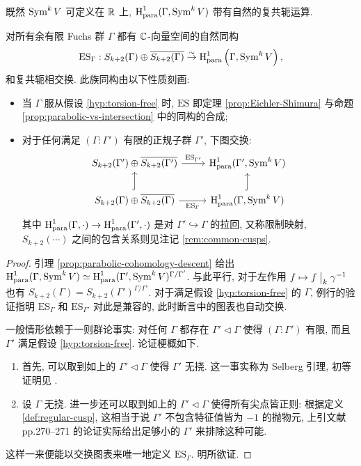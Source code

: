 既然 $\operatorname{Sym}^k V$ 可定义在 $\mathbb{R}$ 上, $\operatorname{H}^1_{\mathrm{para}}(\Gamma, \operatorname{Sym}^k V)$ 带有自然的复共轭运算.

\begin{theorem}\label{prop:Eichler-Shimura-gen}
	对所有余有限 Fuchs 群 $\Gamma$ 都有 $\mathbb{C}$-向量空间的自然同构
	\[ \mathrm{ES}_\Gamma: S_{k+2}(\Gamma) \oplus \overline{S_{k+2}(\Gamma)} \stackrel{\sim}{\rightarrow} \operatorname{H}^1_{\mathrm{para}}\left(\Gamma, \operatorname{Sym}^k V\right), \]
	和复共轭相交换. 此族同构由以下性质刻画:
	\begin{itemize}
		\item 当 $\Gamma$ 服从假设 \ref{hyp:torsion-free} 时, $\mathrm{ES}$ 即定理 \ref{prop:Eichler-Shimura} 与命题 \ref{prop:parabolic-vs-intersection} 中的同构的合成;
		\item 对于任何满足 $(\Gamma : \Gamma')$ 有限的正规子群 $\Gamma'$, 下图交换:
		\[\begin{tikzcd}
			S_{k+2}(\Gamma') \oplus \overline{S_{k+2}(\Gamma')} \arrow[r, "{\mathrm{ES}_{\Gamma'}}"] & \Hm^1_{\mathrm{para}}(\Gamma', \Sym^k V) \\
			S_{k+2}(\Gamma) \oplus \overline{S_{k+2}(\Gamma)} \arrow[r, "{\mathrm{ES}_\Gamma}"'] \arrow[hookrightarrow, u] & \Hm^1_{\mathrm{para}}(\Gamma, \Sym^k V) \arrow[hookrightarrow, u]
		\end{tikzcd}\]
		其中 $\operatorname{H}^1_{\mathrm{para}}(\Gamma, \cdot) \to \operatorname{H}^1_{\mathrm{para}}(\Gamma', \cdot)$ 是对 $\Gamma' \hookrightarrow \Gamma$ 的拉回, 又称限制映射, $S_{k+2}(\cdots)$ 之间的包含关系则见注记 \ref{rem:common-cusps}.
	\end{itemize}
\end{theorem}
\begin{proof}
	引理 \ref{prop:parabolic-cohomology-descent} 给出 $\operatorname{H}^1_{\mathrm{para}}(\Gamma, \operatorname{Sym}^k V) \simeq \operatorname{H}^1_{\mathrm{para}}(\Gamma', \operatorname{Sym}^k V)^{\Gamma/\Gamma'}$. 与此平行, 对于左作用 $f \mapsto f \;\big|_{k} \; \gamma^{-1}$ 也有 $S_{k+2}(\Gamma) = S_{k+2}(\Gamma')^{\Gamma/\Gamma'}$. 对于满足假设 \ref{hyp:torsion-free} 的 $\Gamma$, 例行的验证指明 $\mathrm{ES}_\Gamma$ 和 $\mathrm{ES}_{\Gamma'}$ 对此是兼容的, 此时断言中的图表也自动交换.
	
	一般情形依赖于一则群论事实: 对任何 $\Gamma$ 都存在 $\Gamma' \lhd \Gamma$ 使得 $(\Gamma : \Gamma')$ 有限, 而且 $\Gamma'$ 满足假设 \ref{hyp:torsion-free}. 论证梗概如下.
	\begin{enumerate}
		\item 首先, 可以取到如上的 $\Gamma' \lhd \Gamma$ 使得 $\Gamma'$ 无挠. 这一事实称为 Selberg 引理, 初等证明见 \cite{Al87}.
		\item 设 $\Gamma$ 无挠. 进一步还可以取到如上的 $\Gamma' \lhd \Gamma$ 使得所有尖点皆正则: 根据定义 \ref{def:regular-cusp}, 这相当于说 $\Gamma'$ 不包含特征值皆为 $-1$ 的抛物元, 上引文献 pp.270--271 的论证实际给出足够小的 $\Gamma'$ 来排除这种可能.
	\end{enumerate}

	这样一来便能以交换图表来唯一地定义 $\mathrm{ES}_\Gamma$. 明所欲证.
\end{proof}

